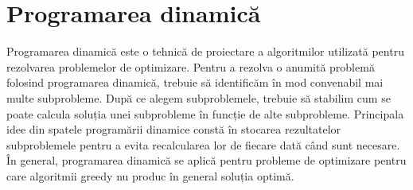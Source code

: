 

\lstset{style=mystyle}

\chapter{Programarea dinamică}
Programarea dinamică este o tehnică de proiectare a algoritmilor utilizată pentru rezolvarea problemelor de optimizare.
Pentru a rezolva o anumită problemă folosind programarea dinamică, trebuie să identificăm în mod convenabil mai multe subprobleme.
După ce alegem subproblemele, trebuie să stabilim cum se poate calcula soluția unei subprobleme în funcție de alte subprobleme.
Principala idee din spatele programării dinamice constă în stocarea rezultatelor subproblemele pentru a evita recalcularea lor de fiecare dată când sunt necesare. În general, programarea dinamică se aplică pentru probleme de optimizare pentru care algoritmii greedy nu produc în general soluția optimă. \cite{Curs}

